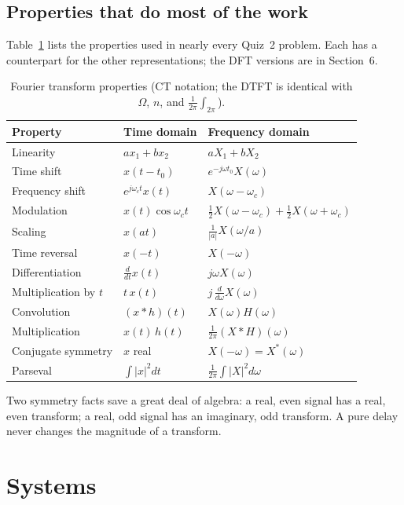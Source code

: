 \documentclass[11pt]{article}
\numberwithin{equation}{section}
\theoremstyle{definition}
\theoremstyle{remark}
\begin{document}
\subsection{Properties that do most of the work}
Table~\ref{tab:props} lists the properties used in nearly every Quiz~2 problem. Each has a
counterpart for the other representations; the DFT versions are in Section~6.

\begin{table}[h]
\centering
\begin{tabular}{@{}lll@{}}
\toprule
Property & Time domain & Frequency domain \\
\midrule
Linearity & $a x_1+b x_2$ & $aX_1+bX_2$\\
Time shift & $x(t-t_0)$ & $e^{-j\omega t_0}X(\omega)$\\
Frequency shift & $e^{j\omega_c t}x(t)$ & $X(\omega-\omega_c)$\\
Modulation & $x(t)\cos\omega_ct$ & $\tfrac12X(\omega-\omega_c)+\tfrac12X(\omega+\omega_c)$\\
Scaling & $x(at)$ & $\tfrac1{|a|}X(\omega/a)$\\
Time reversal & $x(-t)$ & $X(-\omega)$\\
Differentiation & $\frac{d}{dt}x(t)$ & $j\omega X(\omega)$\\
Multiplication by $t$ & $t\,x(t)$ & $j\,\frac{d}{d\omega}X(\omega)$\\
Convolution & $(x*h)(t)$ & $X(\omega)H(\omega)$\\
Multiplication & $x(t)\,h(t)$ & $\tfrac{1}{2\pi}(X*H)(\omega)$\\
Conjugate symmetry & $x$ real & $X(-\omega)=X^*(\omega)$\\
Parseval & $\int|x|^2dt$ & $\frac1{2\pi}\int|X|^2d\omega$\\
\bottomrule
\end{tabular}
\caption{Fourier transform properties (CT notation; the DTFT is identical with $\Omega$, $n$, and
$\frac1{2\pi}\int_{2\pi}$).}
\label{tab:props}
\end{table}

Two symmetry facts save a great deal of algebra:
a real, even signal has a real, even transform; a real, odd signal has an imaginary, odd
transform. A pure delay never changes the magnitude of a transform.

\section{Systems}
\end{document}
